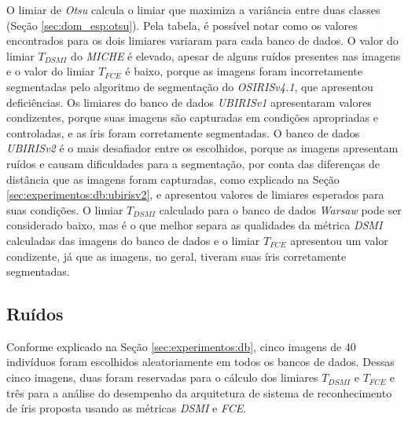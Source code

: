 \par O limiar de \textit{Otsu} calcula o limiar que maximiza a variância entre duas classes (Seção \ref{sec:dom_esp:otsu}). Pela tabela, é possível notar como os valores encontrados para os dois limiares variaram para cada banco de dados. O valor do limiar $T_{DSMI}$  do \textit{MICHE} é elevado, apesar de alguns ruídos presentes nas imagens e o valor do limiar $T_{FCE}$ é baixo, porque as imagens foram incorretamente segmentadas pelo algoritmo de segmentação do \textit{OSIRISv4.1}, que apresentou deficiências. Os limiares do banco de dados \textit{UBIRISv1} apresentaram valores condizentes, porque suas imagens são capturadas em condições apropriadas e controladas, e as íris foram corretamente segmentadas. O banco de dados \textit{UBIRISv2} é o mais desafiador entre os escolhidos, porque as imagens apresentam ruídos e causam dificuldades para a segmentação, por conta das diferenças de distância que as imagens foram capturadas, como explicado na Seção \ref{sec:experimentos:db:ubirisv2}, e apresentou valores de limiares esperados para suas condições. O limiar $T_{DSMI}$ calculado para o banco de dados \textit{\acrshort{Warsaw}} pode ser considerado baixo, mas é o que melhor separa as qualidades da métrica \textit{\acrshort{DSMI}} calculadas das imagens do banco de dados e o limiar $T_{FCE}$ apresentou um valor condizente, já que as imagens, no geral, tiveram suas íris corretamente segmentadas.



\FloatBarrier

\subsection{Ruídos} \label{sec:experimentos:ruidos}

\par Conforme explicado na Seção \ref{sec:experimentos:db}, cinco imagens de 40 indivíduos foram escolhidos aleatoriamente em todos os bancos de dados. Dessas cinco imagens, duas foram reservadas para o cálculo dos limiares $T_{DSMI}$ e $T_{FCE}$ e três para a análise do desempenho da arquitetura de sistema de reconhecimento de íris proposta usando as métricas \textit{\acrshort{DSMI}} e \textit{\acrshort{FCE}}. 

